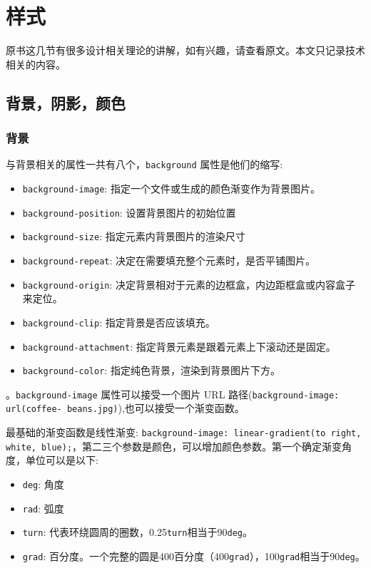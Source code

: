 \section{样式}

原书这几节有很多设计相关理论的讲解，如有兴趣，请查看原文。本文只记录技术相关的内容。

\subsection{背景，阴影，颜色}
\subsubsection*{背景}
与背景相关的属性一共有八个，\texttt{background} 属性是他们的缩写:

\begin{itemize}
    \item \texttt{background-image}: 指定一个文件或生成的颜色渐变作为背景图片。
    \item \texttt{background-position}: 设置背景图片的初始位置
    \item \texttt{background-size}: 指定元素内背景图片的渲染尺寸
    \item \texttt{background-repeat}: 决定在需要填充整个元素时，是否平铺图片。
    \item \texttt{background-origin}: 决定背景相对于元素的边框盒，内边距框盒或内容盒子来定位。
    \item \texttt{background-clip}: 指定背景是否应该填充。
    \item \texttt{background-attachment}: 指定背景元素是跟着元素上下滚动还是固定。
    \item \texttt{background-color}: 指定纯色背景，渲染到背景图片下方。
\end{itemize}

。\texttt{background-image} 属性可以接受一个图片 URL 路径(\texttt{background-image: url(coffee- beans.jpg)}),也可以接受一个渐变函数。

最基础的渐变函数是线性渐变: \texttt{background-image: linear-gradient(to right, white, blue);}，第二三个参数是颜色，可以增加颜色参数。第一个确定渐变角度，单位可以是以下:
\begin{itemize}
    \item \texttt{deg}: 角度
    \item \texttt{rad}: 弧度
    \item \texttt{turn}: 代表环绕圆周的圈数，0.25\texttt{turn}相当于90\texttt{deg}。
    \item \texttt{grad}: 百分度。一个完整的圆是400百分度（400\texttt{grad}），100\texttt{grad}相当于90\texttt{deg}。
\end{itemize}

